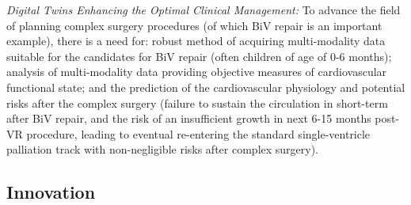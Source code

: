   \smallskip
\textit{Digital Twins Enhancing the Optimal Clinical Management:}
  To advance the field of planning complex surgery procedures (of which BiV repair is an important example), there is a need for: robust method of acquiring multi-modality data suitable for the candidates for BiV repair (often children of age of 0-6 months); analysis of multi-modality data providing objective measures of cardiovascular functional state; and the prediction of the cardiovascular physiology and potential risks after the complex surgery 
  (failure to sustain the circulation in short-term after BiV repair, and 
the risk of an insufficient growth in next 6-15 months post-VR procedure, leading to eventual re-entering the standard single-ventricle palliation track with non-negligible risks after complex surgery).
 
 




\subsection{Innovation}
